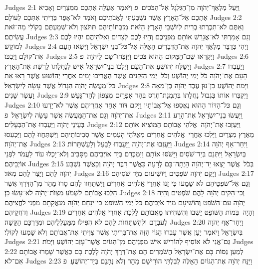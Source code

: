 Judges 2:1	וַיַּעַל מַלְאַךְ־יְהֹוָה מִן־הַגִּלְגָּל אֶל־הַבֹּכִים {פ} וַיֹּאמֶר אַעֲלֶה אֶתְכֶם מִמִּצְרַיִם וָאָבִיא אֶתְכֶם אֶל־הָאָרֶץ אֲשֶׁר נִשְׁבַּעְתִּי לַאֲבֹתֵיכֶם וָאֹמַר לֹא־אָפֵר בְּרִיתִי אִתְּכֶם לְעוֹלָם׃
Judges 2:2	וְאַתֶּם לֹא־תִכְרְתוּ בְרִית לְיוֹשְׁבֵי הָאָרֶץ הַזֹּאת מִזְבְּחוֹתֵיהֶם תִּתֹּצוּן וְלֹא־שְׁמַעְתֶּם בְּקוֹלִי מַה־זֹּאת עֲשִׂיתֶם׃
Judges 2:3	וְגַם אָמַרְתִּי לֹא־אֲגָרֵשׁ אוֹתָם מִפְּנֵיכֶם וְהָיוּ לָכֶם לְצִדִּים וֵאלֹהֵיהֶם יִהְיוּ לָכֶם לְמוֹקֵשׁ׃
Judges 2:4	וַיְהִי כְּדַבֵּר מַלְאַךְ יְהֹוָה אֶת־הַדְּבָרִים הָאֵלֶּה אֶל־כּל־בְּנֵי יִשְׂרָאֵל וַיִּשְׂאוּ הָעָם אֶת־קוֹלָם וַיִּבְכּוּ׃
Judges 2:5	וַיִּקְרְאוּ שֵׁם־הַמָּקוֹם הַהוּא בֹּכִים וַיִּזְבְּחוּ־שָׁם לַיהֹוָה׃ {פ}
Judges 2:6	וַיְשַׁלַּח יְהוֹשֻׁעַ אֶת־הָעָם וַיֵּלְכוּ בְנֵי־יִשְׂרָאֵל אִישׁ לְנַחֲלָתוֹ לָרֶשֶׁת אֶת־הָאָרֶץ׃
Judges 2:7	וַיַּעַבְדוּ הָעָם אֶת־יְהֹוָה כֹּל יְמֵי יְהוֹשֻׁעַ וְכֹל  יְמֵי הַזְּקֵנִים אֲשֶׁר הֶאֱרִיכוּ יָמִים אַחֲרֵי יְהוֹשׁוּעַ אֲשֶׁר רָאוּ אֵת כּל־מַעֲשֵׂה יְהֹוָה הַגָּדוֹל אֲשֶׁר עָשָׂה לְיִשְׂרָאֵל׃
Judges 2:8	וַיָּמת יְהוֹשֻׁעַ בִּן־נוּן עֶבֶד יְהֹוָה בֶּן־מֵאָה וָעֶשֶׂר שָׁנִים׃
Judges 2:9	וַיִּקְבְּרוּ אוֹתוֹ בִּגְבוּל נַחֲלָתוֹ בְּתִמְנַת־חֶרֶס בְּהַר אֶפְרָיִם מִצְּפוֹן לְהַר־גָּעַשׁ׃
Judges 2:10	וְגַם כּל־הַדּוֹר הַהוּא נֶאֶסְפוּ אֶל־אֲבוֹתָיו וַיָּקם דּוֹר אַחֵר אַחֲרֵיהֶם אֲשֶׁר לֹא־יָדְעוּ אֶת־יְהֹוָה וְגַם אֶת־הַמַּעֲשֶׂה אֲשֶׁר עָשָׂה לְיִשְׂרָאֵל׃ {פ}
Judges 2:11	וַיַּעֲשׂוּ בְנֵי־יִשְׂרָאֵל אֶת־הָרַע בְּעֵינֵי יְהֹוָה וַיַּעַבְדוּ אֶת־הַבְּעָלִים׃
Judges 2:12	וַיַּעַזְבוּ אֶת־יְהֹוָה  אֱלֹהֵי אֲבוֹתָם הַמּוֹצִיא אוֹתָם מֵאֶרֶץ מִצְרַיִם וַיֵּלְכוּ אַחֲרֵי  אֱלֹהִים אֲחֵרִים מֵאֱלֹהֵי הָעַמִּים אֲשֶׁר סְבִיבוֹתֵיהֶם וַיִּשְׁתַּחֲווּ לָהֶם וַיַּכְעִסוּ אֶת־יְהֹוָה׃
Judges 2:13	וַיַּעַזְבוּ אֶת־יְהֹוָה וַיַּעַבְדוּ לַבַּעַל וְלָעַשְׁתָּרוֹת׃
Judges 2:14	וַיִּחַר־אַף יְהֹוָה בְּיִשְׂרָאֵל וַיִּתְּנֵם בְּיַד־שֹׁסִים וַיָּשֹׁסּוּ אוֹתָם וַיִּמְכְּרֵם בְּיַד אוֹיְבֵיהֶם מִסָּבִיב וְלֹא־יָכְלוּ עוֹד לַעֲמֹד לִפְנֵי אוֹיְבֵיהֶם׃
Judges 2:15	בְּכֹל  אֲשֶׁר יָצְאוּ יַד־יְהֹוָה הָיְתָה־בָּם לְרָעָה כַּאֲשֶׁר דִּבֶּר יְהֹוָה וְכַאֲשֶׁר נִשְׁבַּע יְהֹוָה לָהֶם וַיֵּצֶר לָהֶם מְאֹד׃
Judges 2:16	וַיָּקֶם יְהֹוָה שֹׁפְטִים וַיּוֹשִׁיעוּם מִיַּד שֹׁסֵיהֶם׃
Judges 2:17	וְגַם אֶל־שֹׁפְטֵיהֶם לֹא שָׁמֵעוּ כִּי זָנוּ אַחֲרֵי אֱלֹהִים אֲחֵרִים וַיִּשְׁתַּחֲווּ לָהֶם סָרוּ מַהֵר מִן־הַדֶּרֶךְ אֲשֶׁר הָלְכוּ אֲבוֹתָם לִשְׁמֹעַ מִצְוֺת־יְהֹוָה לֹא־עָשׂוּ כֵן׃
Judges 2:18	וְכִי־הֵקִים יְהֹוָה  לָהֶם שֹׁפְטִים וְהָיָה יְהֹוָה עִם־הַשֹּׁפֵט וְהוֹשִׁיעָם מִיַּד אֹיְבֵיהֶם כֹּל יְמֵי הַשּׁוֹפֵט כִּי־יִנָּחֵם יְהֹוָה מִנַּאֲקָתָם מִפְּנֵי לֹחֲצֵיהֶם וְדֹחֲקֵיהֶם׃
Judges 2:19	וְהָיָה  בְּמוֹת הַשּׁוֹפֵט יָשֻׁבוּ וְהִשְׁחִיתוּ מֵאֲבוֹתָם לָלֶכֶת אַחֲרֵי אֱלֹהִים אֲחֵרִים לְעבְדָם וּלְהִשְׁתַּחֲוֺת לָהֶם לֹא הִפִּילוּ מִמַּעַלְלֵיהֶם וּמִדַּרְכָּם הַקָּשָׁה׃
Judges 2:20	וַיִּחַר־אַף יְהֹוָה בְּיִשְׂרָאֵל וַיֹּאמֶר יַעַן אֲשֶׁר עָבְרוּ הַגּוֹי הַזֶּה אֶת־בְּרִיתִי אֲשֶׁר צִוִּיתִי אֶת־אֲבוֹתָם וְלֹא שָׁמְעוּ לְקוֹלִי׃
Judges 2:21	גַּם־אֲנִי לֹא אוֹסִיף לְהוֹרִישׁ אִישׁ מִפְּנֵיהֶם מִן־הַגּוֹיִם אֲשֶׁר־עָזַב יְהוֹשֻׁעַ וַיָּמֹת׃
Judges 2:22	לְמַעַן נַסּוֹת בָּם אֶת־יִשְׂרָאֵל הֲשֹׁמְרִים הֵם אֶת־דֶּרֶךְ יְהֹוָה לָלֶכֶת בָּם כַּאֲשֶׁר שָׁמְרוּ אֲבוֹתָם אִם־לֹא׃
Judges 2:23	וַיַּנַּח יְהֹוָה אֶת־הַגּוֹיִם הָאֵלֶּה לְבִלְתִּי הוֹרִישָׁם מַהֵר וְלֹא נְתָנָם בְּיַד־יְהוֹשֻׁעַ׃ {פ}
